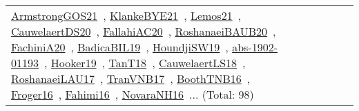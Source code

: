 {\begin{longtable}{lp{3cm}>{\raggedright\arraybackslash}p{6cm}>{\raggedright\arraybackslash}p{6cm}>{\raggedright\arraybackslash}p{8cm}}
\href{../works/ArmstrongGOS21.pdf}{ArmstrongGOS21}~\cite{ArmstrongGOS21}, \href{../works/KlankeBYE21.pdf}{KlankeBYE21}~\cite{KlankeBYE21}, \href{../works/Lemos21.pdf}{Lemos21}~\cite{Lemos21}, \href{../works/CauwelaertDS20.pdf}{CauwelaertDS20}~\cite{CauwelaertDS20}, \href{../works/FallahiAC20.pdf}{FallahiAC20}~\cite{FallahiAC20}, \href{../works/RoshanaeiBAUB20.pdf}{RoshanaeiBAUB20}~\cite{RoshanaeiBAUB20}, \href{../works/FachiniA20.pdf}{FachiniA20}~\cite{FachiniA20}, \href{../works/BadicaBIL19.pdf}{BadicaBIL19}~\cite{BadicaBIL19}, \href{../works/HoundjiSW19.pdf}{HoundjiSW19}~\cite{HoundjiSW19}, \href{../works/abs-1902-01193.pdf}{abs-1902-01193}~\cite{abs-1902-01193}, \href{../works/Hooker19.pdf}{Hooker19}~\cite{Hooker19}, \href{../works/TanT18.pdf}{TanT18}~\cite{TanT18}, \href{../works/CauwelaertLS18.pdf}{CauwelaertLS18}~\cite{CauwelaertLS18}, \href{../works/RoshanaeiLAU17.pdf}{RoshanaeiLAU17}~\cite{RoshanaeiLAU17}, \href{../works/TranVNB17.pdf}{TranVNB17}~\cite{TranVNB17}, \href{../works/BoothTNB16.pdf}{BoothTNB16}~\cite{BoothTNB16}, \href{../works/Froger16.pdf}{Froger16}~\cite{Froger16}, \href{../works/Fahimi16.pdf}{Fahimi16}~\cite{Fahimi16}, \href{../works/NovaraNH16.pdf}{NovaraNH16}~\cite{NovaraNH16}... (Total: 98)\\

\end{longtable}}

